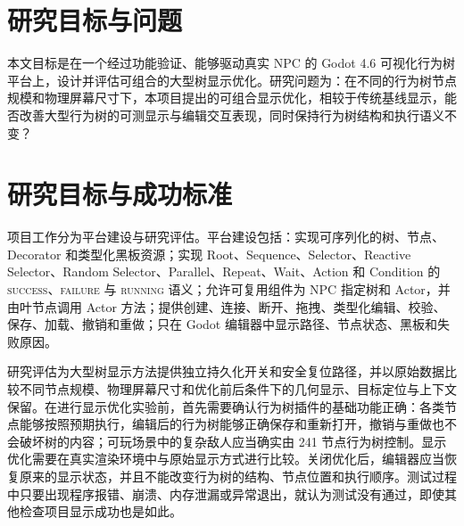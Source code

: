 \section{研究目标与问题}

本文目标是在一个经过功能验证、能够驱动真实 NPC 的 Godot 4.6 可视化行为树平台上，设计并评估可组合的大型树显示优化。研究问题为：在不同的行为树节点规模和物理屏幕尺寸下，本项目提出的可组合显示优化，相较于传统基线显示，能否改善大型行为树的可测显示与编辑交互表现，同时保持行为树结构和执行语义不变？

\section{研究目标与成功标准}

项目工作分为平台建设与研究评估。平台建设包括：实现可序列化的树、节点、Decorator 和类型化黑板资源；实现 Root、Sequence、Selector、Reactive Selector、Random Selector、Parallel、Repeat、Wait、Action 和 Condition 的 \textsc{success}、\textsc{failure} 与 \textsc{running} 语义；允许可复用组件为 NPC 指定树和 Actor，并由叶节点调用 Actor 方法；提供创建、连接、断开、拖拽、类型化编辑、校验、保存、加载、撤销和重做；只在 Godot 编辑器中显示路径、节点状态、黑板和失败原因。

研究评估为大型树显示方法提供独立持久化开关和安全复位路径，并以原始数据比较不同节点规模、物理屏幕尺寸和优化前后条件下的几何显示、目标定位与上下文保留。在进行显示优化实验前，首先需要确认行为树插件的基础功能正确：各类节点能够按照预期执行，编辑后的行为树能够正确保存和重新打开，撤销与重做也不会破坏树的内容；可玩场景中的复杂敌人应当确实由 241 节点行为树控制。显示优化需要在真实渲染环境中与原始显示方式进行比较。关闭优化后，编辑器应当恢复原来的显示状态，并且不能改变行为树的结构、节点位置和执行顺序。测试过程中只要出现程序报错、崩溃、内存泄漏或异常退出，就认为测试没有通过，即使其他检查项目显示成功也是如此。

